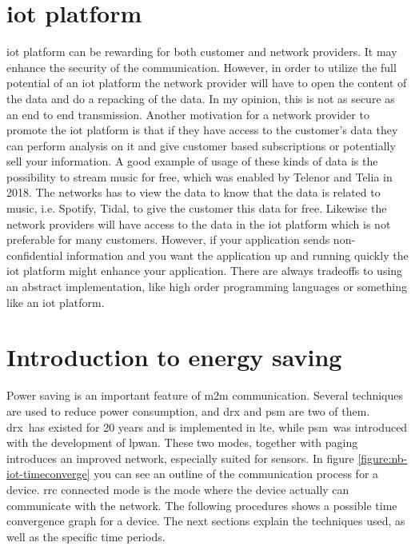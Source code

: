 \documentclass[USenglish]{ifimaster}  %
\begin{document}
\section{\acrshort{iot} platform} \label{section:iotplatform}
\acrshort{iot} platform can be rewarding for both customer and network providers. It may enhance the security of the communication. However, in order to utilize the full potential of an \acrshort{iot} platform the network provider will have to open the content of the data and do a repacking of the data. In my opinion, this is not as secure as an end to end transmission. Another motivation for a network provider to promote the \acrshort{iot} platform is that if they have access to the customer's data they can perform analysis on it and give customer based subscriptions or potentially sell your information. A good example of usage of these kinds of data is the possibility to stream music for free, which was enabled by Telenor and Telia in 2018. The networks has to view the data to know that the data is related to music, i.e. Spotify, Tidal, to give the customer this data for free. Likewise the network providers will have access to the data in the \acrshort{iot} platform which is not preferable for many customers. However, if your application sends non-confidential information and you want the application up and running quickly the \acrshort{iot} platform might enhance your application. There are always tradeoffs to using an abstract implementation, like high order programming languages or something like an \acrshort{iot} platform.

\section{Introduction to energy saving} \label{section:energysaving}
Power saving is an important feature of \acrshort{m2m} communication. Several techniques are used to reduce power consumption, and \acrfull{drx} and \acrfull{psm} are two of them. \acrshort{drx} has existed for 20 years and is implemented in \acrshort{lte}, while \acrshort{psm} was introduced with the development of \acrshort{lpwan}. These two modes, together with paging introduces an improved network, especially suited for sensors. In figure \vref{figure:nb-iot-timeconverge} you can see an outline of the communication process for a device. \acrfull{rrc} connected mode is the mode where the device actually can communicate with the network. The following procedures shows a possible time convergence graph for a device. The next sections explain the techniques used, as well as the specific time periods.
\end{document}
